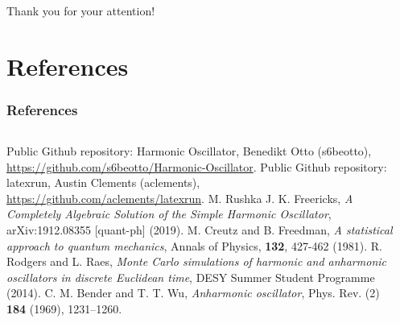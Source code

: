 \documentclass[aspectratio=169]{beamer}
\begin{document}
\begin{frame}
\frametitle{}
\begin{center}
	Thank you for your attention!
\end{center}
\end{frame}

\section{References}
\begin{frame}
\frametitle{References}
\vspace{-20px}
\begin{columns}[T]
	\begin{column}{0.49\textwidth}
		\begin{tiny}
			\begin{thebibliography}{99}
				\fontsize{6}{6}
				 Public Github repository: Harmonic Oscillator, Benedikt Otto (s6beotto), \\\url{https://github.com/s6beotto/Harmonic-Oscillator}.
				 Public Github repository: latexrun, Austin Clements (aclements), \\\url{https://github.com/aclements/latexrun}.
				 M. Rushka J. K. Freericks, \textit{A Completely Algebraic Solution of the Simple Harmonic Oscillator}, arXiv:1912.08355 [quant-ph] (2019).
				 M. Creutz and B. Freedman, \textit{A statistical approach to quantum mechanics}, Annals of Physics, \textbf{132}, 427-462 (1981).
				 R. Rodgers and L. Raes, \textit{Monte Carlo simulations of harmonic and anharmonic oscillators in discrete Euclidean time}, DESY Summer Student Programme (2014).
				 C. M. Bender and T. T. Wu, \textit{Anharmonic oscillator}, Phys. Rev. (2) \textbf{184} (1969), 1231–1260.
				\setcounter{firstbib}{\value{enumiv}}
			\end{thebibliography}
		\end{tiny}
	\end{column}
	\begin{column}{0.49\textwidth}
		\begin{tiny}
			\begin{thebibliography}{99}
				\fontsize{6}{6}
				\setcounter{enumiv}{\value{firstbib}}
			\end{thebibliography}
		\end{tiny}
	\end{column}
\end{columns}
\end{frame}


\appendixstyle

\appendix
\end{document}
